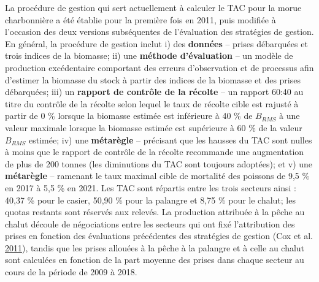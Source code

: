 \documentclass[11pt]{book}
\begin{document}
La procédure de gestion qui sert actuellement à calculer le TAC pour la morue charbonnière a été établie pour la première fois en 2011, puis modifiée à l'occasion des deux versions subséquentes de l'évaluation des stratégies de gestion. En général, la procédure de gestion inclut i) des \textbf{données} -- prises débarquées et trois indices de la biomasse; ii) une \textbf{méthode d'évaluation} -- un modèle de production excédentaire comportant des erreurs d'observation et de processus afin d'estimer la biomasse du stock à partir des indices de la biomasse et des prises débarquées; iii) un \textbf{rapport de contrôle de la récolte} -- un rapport 60:40 au titre du contrôle de la récolte selon lequel le taux de récolte cible est rajusté à partir de 0 \% lorsque la biomasse estimée est inférieure à 40 \% de \(B_{RMS}\) à une valeur maximale lorsque la biomasse estimée est supérieure à 60 \% de la valeur \(B_{RMS}\) estimée; iv) une \textbf{métarègle} -- précisant que les hausses du TAC sont nulles à moins que le rapport de contrôle de la récolte recommande une augmentation de plus de 200 tonnes (les diminutions du TAC sont toujours adoptées); et v) une \textbf{métarègle} -- ramenant le taux maximal cible de mortalité des poissons de 9,5 \% en 2017 à 5,5 \% en 2021. Les TAC sont répartis entre les trois secteurs ainsi : 40,37 \% pour le casier, 50,90 \% pour la palangre et 8,75 \% pour le chalut; les quotas restants sont réservés aux relevés. La production attribuée à la pêche au chalut découle de négociations entre les secteurs qui ont fixé l'attribution des prises en fonction des évaluations précédentes des stratégies de gestion (Cox et al. \protect\hyperlink{ref-cox2011management}{2011}), tandis que les prises allouées à la pêche à la palangre et à celle au chalut sont calculées en fonction de la part moyenne des prises dans chaque secteur au cours de la période de 2009 à 2018.
\end{document}
